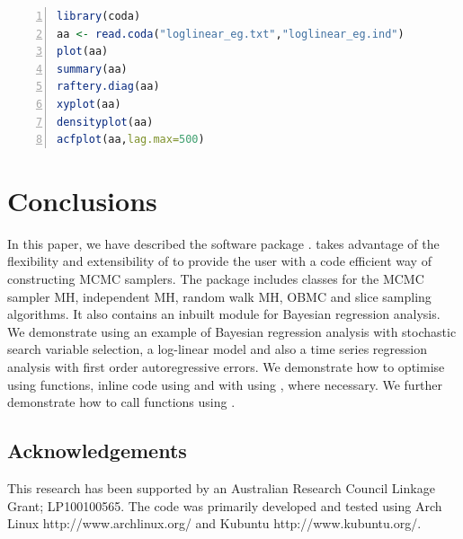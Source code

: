 \documentclass[article]{jss}
\begin{document}
\begin{lstlisting}[basicstyle={\scriptsize},language=R,numbers=left]
library(coda)
aa <- read.coda("loglinear_eg.txt","loglinear_eg.ind")
plot(aa)
summary(aa)
raftery.diag(aa)
xyplot(aa)
densityplot(aa)
acfplot(aa,lag.max=500)

\end{lstlisting}



\section{Conclusions}
\label{sec:Conclusions}

In this paper, we have described the  software
package .   takes advantage of the flexibility
and extensibility of  to provide the user with a code
efficient way of constructing MCMC samplers. The  package
includes classes for the MCMC sampler MH, independent MH, random walk
MH, OBMC and slice sampling algorithms.  It also contains an inbuilt
module for Bayesian regression analysis.  We demonstrate 
using an example of Bayesian regression analysis with stochastic
search variable selection, a log-linear model and also a time series
regression analysis with first order autoregressive errors. We
demonstrate how to optimise  using  functions,
inline  code using  and with
 using , where necessary.  We further
demonstrate how to call  functions using .


\subsection*{Acknowledgements}

This research has been supported by an Australian Research Council
Linkage Grant; LP100100565. The code was primarily developed and
tested using Arch Linux http://www.archlinux.org/ and Kubuntu
http://www.kubuntu.org/.


\end{document}
